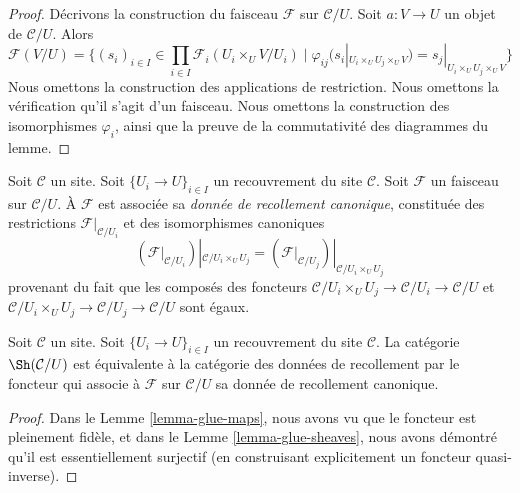 \begin{proof}
Décrivons la construction du faisceau $\mathcal{F}$ sur
$\mathcal{C}/U$. Soit $a : V \to U$ un objet de $\mathcal{C}/U$.
Alors
$$
\mathcal{F}(V/U) = \{
(s_i)_{i \in I} \in \prod_{i \in I} \mathcal{F}_i(U_i \times_U V/U_i)
\mid
\varphi_{ij}(s_i|_{U_i \times_U U_j \times_U V})
=
s_j|_{U_i \times_U U_j \times_U V}
\}
$$
Nous omettons la construction des applications de restriction.
Nous omettons la vérification qu’il s’agit d’un faisceau.
Nous omettons la construction des isomorphismes $\varphi_i$,
ainsi que la preuve de la commutativité des diagrammes
du lemme.
\end{proof}

\noindent
Soit $\mathcal{C}$ un site.
Soit $\{U_i \to U\}_{i \in I}$ un recouvrement du site $\mathcal{C}$.
Soit $\mathcal{F}$ un faisceau sur $\mathcal{C}/U$.
À $\mathcal{F}$ est associée sa
{\it donnée de recollement canonique}, constituée des restrictions
$\mathcal{F}|_{\mathcal{C}/U_i}$ et des isomorphismes canoniques
$$
\left(\mathcal{F}|_{\mathcal{C}/U_i}\right)|_{\mathcal{C}/U_i \times_U U_j}
=
\left(\mathcal{F}|_{\mathcal{C}/U_j}\right)|_{\mathcal{C}/U_i \times_U U_j}
$$
provenant du fait que les composés des foncteurs
$\mathcal{C}/U_i \times_U U_j \to \mathcal{C}/U_i \to \mathcal{C}/U$
et
$\mathcal{C}/U_i \times_U U_j \to \mathcal{C}/U_j \to \mathcal{C}/U$
sont égaux.

\begin{lemma}
\label{lemma-mapping-property-glue}
Soit $\mathcal{C}$ un site.
Soit $\{U_i \to U\}_{i \in I}$ un recouvrement du site $\mathcal{C}$.
La catégorie $\Sh(\mathcal{C}/U)$ est équivalente
à la catégorie des données de recollement par le foncteur qui associe
à $\mathcal{F}$ sur $\mathcal{C}/U$ sa donnée de recollement canonique.
\end{lemma}

\begin{proof}
Dans le
Lemme \ref{lemma-glue-maps},
nous avons vu que le foncteur est pleinement fidèle, et dans le
Lemme \ref{lemma-glue-sheaves},
nous avons démontré qu’il est essentiellement surjectif (en construisant
explicitement un foncteur quasi-inverse).
\end{proof}

